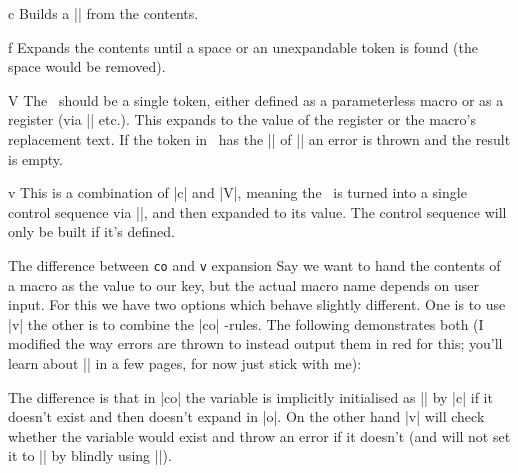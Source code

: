 \begin{function}[module=Expansion]{c}
  Builds a |\csname| from the contents.
\end{function}

\begin{function}[module=Expansion]{f}
  Expands the contents until a space or an unexpandable token is found (the
  space would be removed).
\end{function}

\begin{function}[module=Expansion]{V}
  The \val\ should be a single token, either defined as a parameterless macro or
  as a register (via |\newcount| etc.). This expands to the value of the
  register or the macro's replacement text. If the token in \val\ has the
  |\meaning| of |\relax| an error is thrown and the result is empty.
\end{function}

\begin{function}[module=Expansion]{v}
  This is a combination of |c| and |V|, meaning the \val\ is turned into a
  single control sequence via |\csname|, and then expanded to its value. The
  control sequence will only be built if it's defined.
\end{function}
\begin{example}{The difference between \texttt{co} and \texttt{v} expansion}
  Say we want to hand the contents of a macro as the value to our key, but the
  actual macro name depends on user input. For this we have two options which
  behave slightly different. One is to use |v| the other is to combine the |co|
  \expansion-rules. The following demonstrates both (I modified the way errors
  are thrown to instead output them in red for this; you'll learn about
  |\ekvparse| in a few pages, for now just stick with me):
  \expkvdocPrintErrors
  \makeatletter
  The difference is that in |co| the variable is implicitly initialised as
  |\relax| by |c| if it doesn't exist and then doesn't expand in |o|. On the
  other hand |v| will check whether the variable would exist and throw an error
  if it doesn't (and will not set it to |\relax| by blindly using |\csname|).
\end{example}

